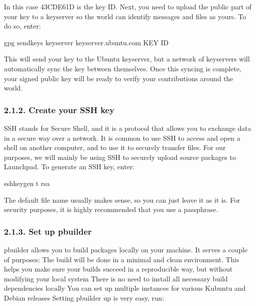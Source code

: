 \documentclass[letterpaper,10pt,english]{sphinxmanual}
\begin{document}
In this case 43CDE61D is the key ID.
Next, you need to upload the public part of your key to a keyserver so the world can identify messages and files as yours. To do so, enter:

\begin{sphinxVerbatim}[commandchars=\\\{\}]
\PYGZdl{} gpg \PYGZhy{}\PYGZhy{}send\PYGZhy{}keys \PYGZhy{}\PYGZhy{}keyserver keyserver.ubuntu.com \PYGZlt{}KEY ID\PYGZgt{}
\end{sphinxVerbatim}

This will send your key to the Ubuntu keyserver, but a network of keyservers will automatically sync the key between themselves. Once this syncing is complete, your signed public key will be ready to verify your contributions around the world.


\subsubsection{2.1.2. Create your SSH key}
\label{\detokenize{docs/packaging_guide/getting_started:create-your-ssh-key}}
SSH stands for Secure Shell, and it is a protocol that allows you to exchange data in a secure way over a network. It is common to use SSH to access and open a shell on another computer, and to use it to securely transfer files. For our purposes, we will mainly be using SSH to securely upload source packages to Launchpad.
To generate an SSH key, enter:

\begin{sphinxVerbatim}[commandchars=\\\{\}]
\PYGZdl{} ssh\PYGZhy{}keygen \PYGZhy{}t rsa
\end{sphinxVerbatim}

The default file name usually makes sense, so you can just leave it as it is. For security purposes, it is highly recommended that you use a passphrase.


\subsubsection{2.1.3. Set up pbuilder}
\label{\detokenize{docs/packaging_guide/getting_started:set-up-pbuilder}}
pbuilder allows you to build packages locally on your machine. It serves a couple of purposes:
The build will be done in a minimal and clean environment. This helps you make sure your builds succeed in a reproducible way, but without modifying your local system
There is no need to install all necessary build dependencies locally
You can set up multiple instances for various Kubuntu and Debian releases
Setting pbuilder up is very easy, run:
\end{document}
